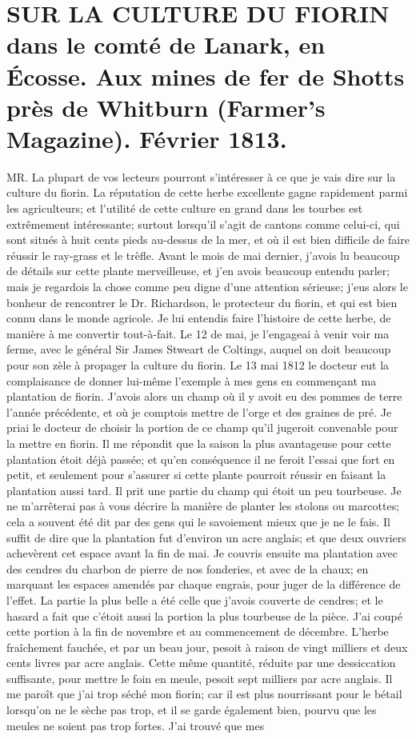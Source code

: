 \setcounter{page}{293}
\section{SUR LA CULTURE DU FIORIN dans le comté de Lanark, en Écosse. Aux mines de fer de Shotts près de Whitburn (Farmer's Magazine). Février 1813.}
MR.
La plupart de vos lecteurs pourront s'intéresser à ce que je vais dire sur la culture du fiorin. La réputation de cette herbe excellente gagne rapidement parmi les agriculteurs; et l'utilité de cette culture en grand dans les tourbes est extrêmement intéressante; surtout lorsqu'il s'agit de cantons comme celui-ci, qui sont situés à huit cents pieds au-dessus de la mer, et où il est bien difficile de faire réussir le ray-grass et le trèfle.
Avant le mois de mai dernier, j'avois lu beaucoup de détails sur cette plante merveilleuse, et j'en avois beaucoup entendu parler; mais je regardois la chose comme peu digne d'une attention sérieuse; j'eus alors le bonheur de rencontrer le Dr. Richardson, le protecteur du fiorin, et qui est bien connu dans le monde agricole. Je lui entendis faire\setcounter{page}{294} l'histoire de cette herbe, de manière à me convertir tout-à-fait. Le 12 de mai, je l'engageai à venir voir ma ferme, avec le général Sir James Stweart de Coltings, auquel on doit beaucoup pour son zèle à propager la culture du fiorin. Le 13 mai 1812 le docteur eut la complaisance de donner lui-même l'exemple à mes gens en commençant ma plantation de fiorin. J'avois alors un champ où il y avoit eu des pommes de terre l'année précédente, et où je comptois mettre de l'orge et des graines de pré. Je priai le docteur de choisir la portion de ce champ qu'il jugeroit convenable pour la mettre en fiorin. Il me répondit que la saison la plus avantageuse pour cette plantation étoit déjà passée; et qu'en conséquence il ne feroit l'essai que fort en petit, et seulement pour s'assurer si cette plante pourroit réussir en faisant la plantation aussi tard. Il prit une partie du champ qui étoit un peu tourbeuse. Je ne m'arrêterai pas à vous décrire la manière de planter les stolons ou marcottes; cela a souvent été dit par des gens qui le savoiement mieux que je ne le fais. Il suffit de dire que la plantation fut d'environ un acre anglais; et que deux ouvriers achevèrent cet espace avant la fin de mai. Je couvris ensuite ma plantation avec des\setcounter{page}{295} cendres du charbon de pierre de nos fonderies, et avec de la chaux; en marquant les espaces amendés par chaque engrais, pour juger de la différence de l'effet. La partie la plus belle a été celle que j'avois couverte de cendres; et le hasard a fait que c'étoit aussi la portion la plus tourbeuse de la pièce. J'ai coupé cette portion à la fin de novembre et au commencement de décembre. L'herbe fraîchement fauchée, et par un beau jour, pesoit à raison de vingt milliers et deux cents livres par acre anglais. Cette même quantité, réduite par une dessiccation suffisante, pour mettre le foin en meule, pesoit sept milliers par acre anglais. Il me paroît que j'ai trop séché mon fiorin; car il est plus nourrissant pour le bétail lorsqu'on ne le sèche pas trop, et il se garde également bien, pourvu que les meules ne soient pas trop fortes. J'ai trouvé que mes 